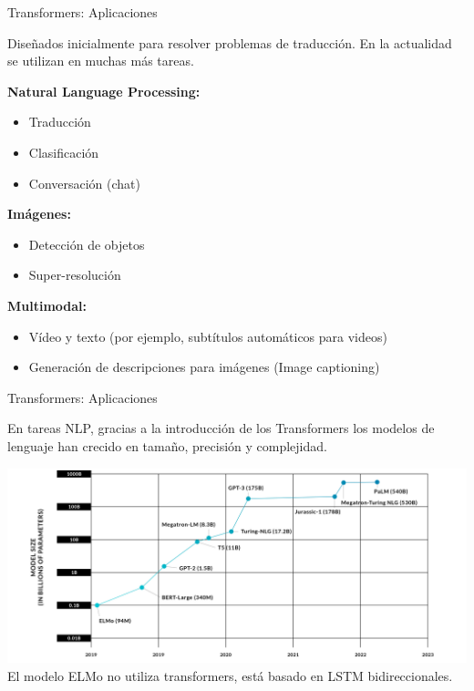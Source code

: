 \documentclass[aspectratio=169]{beamer}
\begin{document}
\begin{frame}[t]{Transformers: Aplicaciones}
  \begin{block}{}
    Diseñados inicialmente para resolver problemas de traducción. En la actualidad se utilizan en muchas más tareas.
  \end{block}

  \textbf{Natural Language Processing:}
  \begin{itemize}
    \item Traducción
    \item Clasificación
    \item Conversación (chat)
  \end{itemize}

  \textbf{Imágenes:}
  \begin{itemize}
    \item Detección de objetos
    \item Super-resolución
  \end{itemize}

  \textbf{Multimodal:}
  \begin{itemize}
    \item Vídeo y texto (por ejemplo, subtítulos automáticos para videos)
    \item Generación de descripciones para imágenes (Image captioning)
  \end{itemize}

\end{frame}

\begin{frame}[t]{Transformers: Aplicaciones}
  \begin{block}{}
    En tareas NLP, gracias a la introducción de los Transformers los modelos de lenguaje han crecido en tamaño, precisión y complejidad.
  \end{block}
  \vspace{.2cm}
  \includegraphics[width=.75\textwidth, center]{imgs/tema4/att/llm_graph.png}
  \vspace{.2cm}
  El modelo ELMo no utiliza transformers, está basado en LSTM bidireccionales.
\end{frame}
\end{document}
